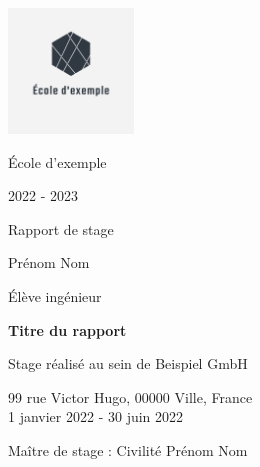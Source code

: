 \begin{titlepage}
    \begin{center}
        
        \includegraphics[width=0.25\textwidth]{couverture/logo.png}
        
        \vspace*{1cm}
        
        \large
        École d'exemple
        
        \vspace{0.5cm}
        
        2022 - 2023

        \vspace{0.5cm}

        \LARGE
        Rapport de stage
            
        \vspace{1cm}
        
        \Large
        Prénom Nom
        
        \vspace{1cm}
        Élève ingénieur
        
        \vspace{1cm}
        
        \LARGE
        \textbf{Titre du rapport}
        
        \vfill
        
        \large
        Stage réalisé au sein de Beispiel GmbH
        
        \vspace{0.25cm}
        
        \normalsize
        99 rue Victor Hugo, 00000 Ville, France\\
        1 janvier 2022 - 30 juin 2022
        
        \vspace{0.5cm}
        
        \Large
        Maître de stage : Civilité Prénom Nom
    \end{center}
\end{titlepage}